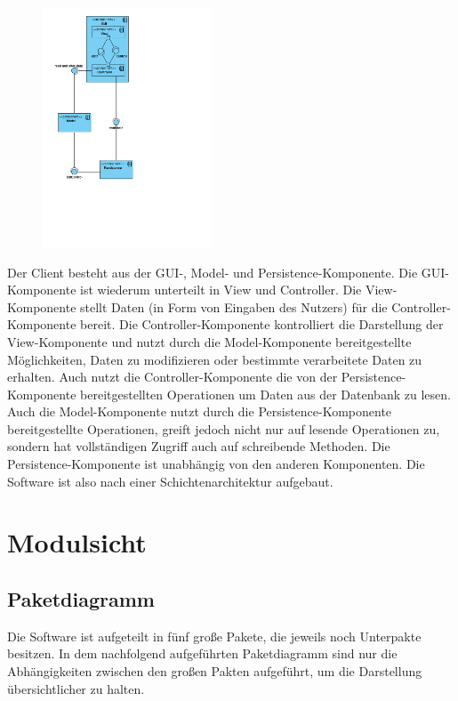 \documentclass[fontsize=12pt,paper=a4,twoside]{scrartcl}
\begin{document}
\begin{figure}[H]
\centering
\includegraphics[width=0.45\textwidth]{konzeptsicht.pdf}
\end{figure}


Der Client besteht aus der GUI-, Model- und Persistence-Komponente. Die GUI-Komponente ist wiederum unterteilt in View und Controller. Die View-Komponente stellt Daten (in Form von Eingaben des Nutzers) für die Controller-Komponente bereit. Die Controller-Komponente kontrolliert die Darstellung der View-Komponente und nutzt durch die Model-Komponente bereitgestellte Möglichkeiten, Daten zu modifizieren oder bestimmte verarbeitete Daten zu erhalten. Auch nutzt die Controller-Komponente die von der Persistence-Komponente bereitgestellten Operationen um Daten aus der Datenbank zu lesen. Auch die Model-Komponente nutzt durch die Persistence-Komponente bereitgestellte Operationen, greift jedoch nicht nur auf lesende Operationen zu, sondern hat vollständigen Zugriff auch auf schreibende Methoden. Die Persistence-Komponente ist unabhängig von den anderen Komponenten. Die Software ist also nach einer Schichtenarchitektur aufgebaut.

\section{Modulsicht}
\label{sec:modulsicht}

\subsection{Paketdiagramm}
Die Software ist aufgeteilt in fünf große Pakete, die jeweils noch Unterpakte besitzen. In dem nachfolgend aufgeführten Paketdiagramm sind nur die Abhängigkeiten zwischen den großen Pakten aufgeführt, um die Darstellung übersichtlicher zu halten.
\end{document}
